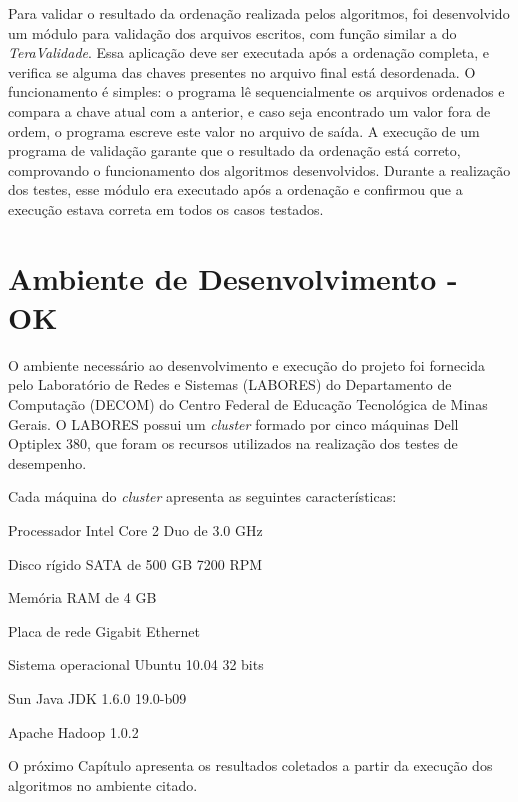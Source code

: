 Para validar o resultado da ordenação realizada pelos algoritmos, foi desenvolvido um módulo para validação dos arquivos escritos, com função similar a do \textit{TeraValidade}. 
Essa aplicação deve ser executada após a ordenação completa, e verifica se alguma das chaves presentes no arquivo final está desordenada. O funcionamento é simples: o programa lê sequencialmente os arquivos ordenados e compara a chave atual com a anterior, e caso seja encontrado um valor fora de ordem, o programa escreve este valor no arquivo de saída. 
A execução de um programa de validação garante que o resultado da ordenação está correto, comprovando o funcionamento dos algoritmos desenvolvidos. 
Durante a realização dos testes, esse módulo era executado após a ordenação e confirmou que a execução estava correta em todos os casos testados.



\section{Ambiente de Desenvolvimento - OK}

O ambiente necessário ao desenvolvimento e execução do projeto foi fornecida pelo Laboratório de Redes e Sistemas (LABORES) do Departamento de Computação (DECOM) do Centro Federal de Educação Tecnológica de Minas Gerais. O LABORES possui um \textit{cluster} formado por cinco máquinas Dell Optiplex 380, que foram os recursos utilizados na realização dos testes de desempenho.

Cada máquina do \textit{cluster} apresenta as seguintes características:
\begin{packed_enum}
\item Processador Intel Core 2 Duo de 3.0 GHz
\item Disco rígido SATA de 500 GB 7200 RPM
\item Memória RAM de 4 GB
\item Placa de rede Gigabit Ethernet
\item Sistema operacional Ubuntu 10.04 32 bits %
\item Sun Java JDK 1.6.0 19.0-b09 
\item Apache Hadoop 1.0.2
\end{packed_enum}


O próximo Capítulo apresenta os resultados coletados a partir da execução dos algoritmos no ambiente citado. 
